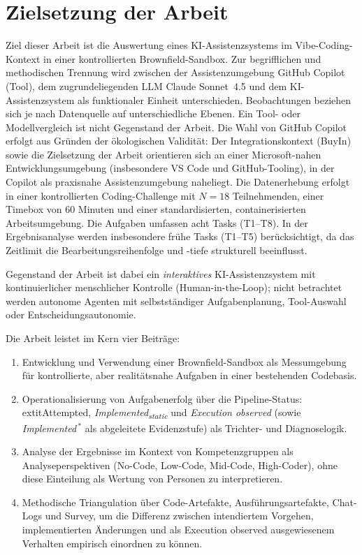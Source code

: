 \section{Zielsetzung der Arbeit}
Ziel dieser Arbeit ist die Auswertung eines KI-Assistenzsystems im Vibe-Coding-Kontext in einer kontrollierten Brownfield-Sandbox.
Zur begrifflichen und methodischen Trennung wird zwischen der Assistenzumgebung GitHub Copilot (Tool), dem zugrundeliegenden LLM Claude Sonnet~4.5 und dem KI-Assistenzsystem als funktionaler Einheit unterschieden.
Beobachtungen beziehen sich je nach Datenquelle auf unterschiedliche Ebenen.
Ein Tool- oder Modellvergleich ist nicht Gegenstand der Arbeit.
Die Wahl von GitHub Copilot erfolgt aus Gründen der ökologischen Validität: Der Integrationskontext (BuyIn) sowie die Zielsetzung der Arbeit orientieren sich an einer Microsoft-nahen Entwicklungsumgebung (insbesondere VS Code und GitHub-Tooling), in der Copilot als praxisnahe Assistenzumgebung naheliegt.
Die Datenerhebung erfolgt in einer kontrollierten Coding-Challenge mit $N = 18$ Teilnehmenden, einer Timebox von 60 Minuten und einer standardisierten, containerisierten Arbeitsumgebung.
Die Aufgaben umfassen acht Tasks (T1--T8).
In der Ergebnisanalyse werden insbesondere frühe Tasks (T1--T5) berücksichtigt, da das Zeitlimit die Bearbeitungsreihenfolge und -tiefe strukturell beeinflusst.

Gegenstand der Arbeit ist dabei ein \emph{interaktives} KI-Assistenzsystem mit kontinuierlicher menschlicher Kontrolle (Human-in-the-Loop); nicht betrachtet werden autonome Agenten mit selbstständiger Aufgabenplanung, Tool-Auswahl oder Entscheidungsautonomie.

Die Arbeit leistet im Kern vier Beiträge:
\begin{enumerate}
    \item[(a)] Entwicklung und Verwendung einer Brownfield-Sandbox als Messumgebung für kontrollierte, aber realitätsnahe Aufgaben in einer bestehenden Codebasis.
    \item[(b)] Operationalisierung von Aufgabenerfolg über die Pipeline-Status: \\
          	extit{Attempted}, \textit{Implemented\textsubscript{static}} und \textit{Execution observed} (sowie \textit{Implemented}\,$^\ast$ als abgeleitete Evidenzstufe) als Trichter- und Diagnoselogik.
    \item[(c)] Analyse der Ergebnisse im Kontext von Kompetenzgruppen als Analyseperspektiven (No-Code, Low-Code, Mid-Code, High-Coder), ohne diese Einteilung als Wertung von Personen zu interpretieren.
    \item[(d)] Methodische Triangulation über Code-Artefakte, Ausführungsartefakte, Chat-Logs und Survey, um die Differenz zwischen intendiertem Vorgehen, implementierten Änderungen und als Execution observed ausgewiesenem Verhalten empirisch einordnen zu können.
\end{enumerate}

